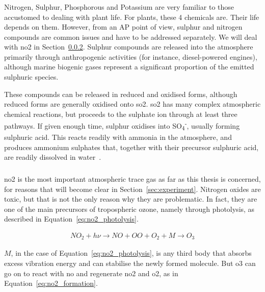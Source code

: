\subsubsection{}%
\label{ssub:so2}

Nitrogen, Sulphur, Phosphorous and Potassium are very familiar to those
accustomed to dealing with plant life. For plants, these 4 chemicals
are. Their life depends on them. However, from an \gls{AP} point of
view, sulphur and nitrogen compounds are common issues and have to be
addressed separately. We will deal with \gls{no2} in
Section~\ref{ssub:no2}. Sulphur compounds are released into the
atmosphere primarily through anthropogenic activities (for instance,
diesel-powered engines), although marine biogenic gases represent a
significant proportion of the emitted sulphuric species.

These compounds can be released in reduced and oxidised forms, although
reduced forms are generally oxidised onto \gls{so2}. \gls{so2} has many
complex atmospheric chemical reactions, but proceeds to the sulphate ion
through at least three pathways. If given enough time, sulphur oxidises
into SO\textsubscript{4}\textsuperscript{-}, usually forming sulphuric
acid. This reacts readily with ammonia in the atmosphere, and produces
ammonium sulphates that, together with their precursor sulphuric acid,
are readily dissolved in water~\cite{Bourdeau}.

\subsubsection{}%
\label{ssub:no2}

\gls{no2} is the most important atmospheric trace gas as far as this
thesis is concerned, for reasons that will become clear in
Section~\ref{sec:experiment}. Nitrogen oxides are toxic, but that is not
the only reason why they are problematic. In fact, they are one of the
main precursors of tropospheric ozone, namely through photolysis, as
described in Equation~\ref{eq:no2_photolysis}.

\begin{align}
    \label{eq:no2_photolysis}
    NO_2 + h\nu \rightarrow NO + O
    O + O_2 + M \rightarrow O_3
\end{align}

$M$, in the case of Equation~\ref{eq:no2_photolysis}, is any third body
that absorbs excess vibration energy and can stabilise the newly formed
molecule. But \gls{o3} can go on to react with \gls{no} and regenerate
\gls{no2} and \gls{o2}, as in Equation~\ref{eq:no2_formation}.

